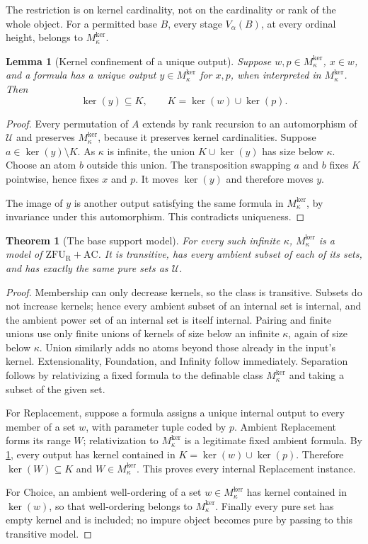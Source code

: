 \documentclass[11pt,letterpaper]{article}
\newtheorem{theorem}{Theorem}[section]
\newtheorem{lemma}[lemma]{Lemma}\aliascntresetthe{lemma}
\theoremstyle{definition}
\theoremstyle{remark}
\newcommand{\ZFUR}{\mathrm{ZFU}_{\mathrm R}}
\newcommand{\AC}{\mathrm{AC}}
\newcommand{\kerat}{\operatorname{ker}}
\newcommand{\Mker}{M^{\mathrm{ker}}}
\newcommand{\Uk}{\mathcal U}
\begin{document}
The restriction is on kernel cardinality, not on the cardinality or rank of the whole object. For a permitted base $B$, every stage $V_\alpha(B)$, at every ordinal height, belongs to $\Mker_\kappa$.

\begin{lemma}[Kernel confinement of a unique output]
\label{hset:zr:lem:confinement}
Suppose $w,p\in \Mker_\kappa$, $x\in w$, and a formula has a unique output $y\in \Mker_\kappa$ for $x,p$, when interpreted in $\Mker_\kappa$. Then
\[
\kerat(y)\subseteq K,
\qquad K=\kerat(w)\cup\kerat(p).
\]
\end{lemma}
\begin{proof}
Every permutation of $A$ extends by rank recursion to an automorphism of $\Uk$ and preserves $\Mker_\kappa$, because it preserves kernel cardinalities. Suppose $a\in\kerat(y)\setminus K$. As $\kappa$ is infinite, the union $K\cup\kerat(y)$ has size below $\kappa$. Choose an atom $b$ outside this union. The transposition swapping $a$ and $b$ fixes $K$ pointwise, hence fixes $x$ and $p$. It moves $\kerat(y)$ and therefore moves $y$.

The image of $y$ is another output satisfying the same formula in $\Mker_\kappa$, by invariance under this automorphism. This contradicts uniqueness.
\end{proof}

\begin{theorem}[The base support model]
\label{hset:zr:thm:supportbase}
For every such infinite $\kappa$, $\Mker_\kappa$ is a model of $\ZFUR+\AC$. It is transitive, has every ambient subset of each of its sets, and has exactly the same pure sets as $\Uk$.
\end{theorem}
\begin{proof}
Membership can only decrease kernels, so the class is transitive. Subsets do not increase kernels; hence every ambient subset of an internal set is internal, and the ambient power set of an internal set is itself internal. Pairing and finite unions use only finite unions of kernels of size below an infinite $\kappa$, again of size below $\kappa$. Union similarly adds no atoms beyond those already in the input's kernel. Extensionality, Foundation, and Infinity follow immediately. Separation follows by relativizing a fixed formula to the definable class $\Mker_\kappa$ and taking a subset of the given set.

For Replacement, suppose a formula assigns a unique internal output to every member of a set $w$, with parameter tuple coded by $p$. Ambient Replacement forms its range $W$; relativization to $\Mker_\kappa$ is a legitimate fixed ambient formula. By \cref{hset:zr:lem:confinement}, every output has kernel contained in $K=\kerat(w)\cup\kerat(p)$. Therefore $\kerat(W)\subseteq K$ and $W\in \Mker_\kappa$. This proves every internal Replacement instance.

For Choice, an ambient well-ordering of a set $w\in \Mker_\kappa$ has kernel contained in $\kerat(w)$, so that well-ordering belongs to $\Mker_\kappa$. Finally every pure set has empty kernel and is included; no impure object becomes pure by passing to this transitive model.
\end{proof}
\end{document}
